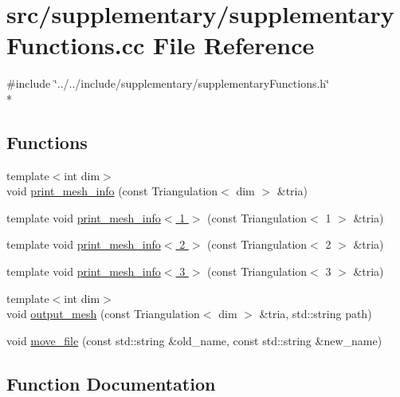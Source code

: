 \section{src/supplementary/supplementary\-Functions.cc File Reference}
\label{supplementary_functions_8cc}
{\ttfamily \#include \char`\"{}../../include/supplementary/supplementary\-Functions.\-h\char`\"{}}\\*
\subsection*{Functions}
\begin{DoxyCompactItemize}
\item 
{\footnotesize template$<$int dim$>$ }\\void \hyperlink{group___supplementary_ga2971a293263dddc17f3df81add2ffbbe}{print\-\_\-mesh\-\_\-info} (const Triangulation$<$ dim $>$ \&tria)
\item 
template void \hyperlink{supplementary_functions_8cc_a27ee4a9830113522595a507a921b56e5}{print\-\_\-mesh\-\_\-info$<$ 1 $>$} (const Triangulation$<$ 1 $>$ \&tria)
\item 
template void \hyperlink{supplementary_functions_8cc_a26717733da51a761f009de3a1e57cf15}{print\-\_\-mesh\-\_\-info$<$ 2 $>$} (const Triangulation$<$ 2 $>$ \&tria)
\item 
template void \hyperlink{supplementary_functions_8cc_a6bd7935769f623c78960b765b08865c2}{print\-\_\-mesh\-\_\-info$<$ 3 $>$} (const Triangulation$<$ 3 $>$ \&tria)
\item 
{\footnotesize template$<$int dim$>$ }\\void \hyperlink{group___supplementary_ga0272b346b175b931e89b017fd93b5b80}{output\-\_\-mesh} (const Triangulation$<$ dim $>$ \&tria, std\-::string path)
\item 
void \hyperlink{group___supplementary_gae0eb2d2afc3e33a9bb3b409b0171c470}{move\-\_\-file} (const std\-::string \&old\-\_\-name, const std\-::string \&new\-\_\-name)
\end{DoxyCompactItemize}


\subsection{Function Documentation}
